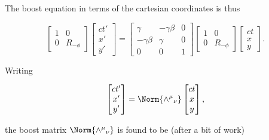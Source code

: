 The boost equation in terms of the cartesian coordinates is thus

\begin{equation}\label{eqn:complexPlanarBoost:220}
\begin{bmatrix}
1 & 0 \\
0 & R_{-\phi}
\end{bmatrix}
\begin{bmatrix}
c t' \\
x' \\
y'
\end{bmatrix}
=
\begin{bmatrix}
\gamma & -\gamma \beta & 0 \\
-\gamma \beta & \gamma & 0 \\
0 & 0 & 1
\end{bmatrix}
\begin{bmatrix}
1 & 0 \\
0 & R_{-\phi}
\end{bmatrix}
\begin{bmatrix}
c t \\
x \\
y
\end{bmatrix}.
\end{equation}

Writing

\begin{equation}\label{eqn:complexPlanarBoost:240}
\begin{bmatrix}
c t' \\
x' \\
y'
\end{bmatrix}
=
\Norm{{\wedge^\mu}_\nu} 
\begin{bmatrix}
c t \\
x \\
y
\end{bmatrix},
\end{equation}

the boost matrix $\Norm{{\wedge^\mu}_\nu}$ is found to be (after a bit of work)


